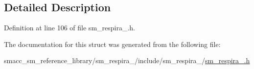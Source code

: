 \subsection{Detailed Description}


Definition at line 106 of file sm\+\_\+respira\+\_.\+h.



The documentation for this struct was generated from the following file\+:\begin{DoxyCompactItemize}
\item 
smacc\+\_\+sm\+\_\+reference\+\_\+library/sm\+\_\+respira\+\_/include/sm\+\_\+respira\+\_/\hyperlink{sm__respira__1_8h}{sm\+\_\+respira\+\_.\+h}\end{DoxyCompactItemize}
